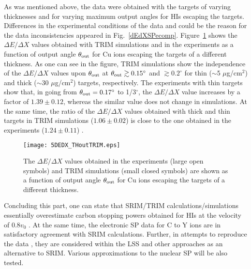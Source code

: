 \documentclass[aps,pra,twocolumn,amsmath,amssymb,floatfix]{revtex4-2}
\begin{document}
As was mentioned above, the data \cite{Fastrup66,Hvelp68,Lennard86} were obtained with the targets of varying thicknesses and for varying maximum output angles for HIs escaping the targets. Differences in the experimental conditions of the data \cite{Fastrup66,Hvelp68} and \cite{Lennard86} could be the reason for the data  inconsistencies appeared in Fig.~\ref{dEdXSPecomp}. Figure~\ref{dEdXTHout} shows the $\Delta E/\Delta X$ values obtained with TRIM simulations and in the experiments \cite{Hvelp68,Lennard86} as a function of output angle $\theta_{\rm out}$ for Cu ions escaping the targets of a different thickness. As one can see in the figure, TRIM simulations show the independence of the $\Delta E/\Delta X$ values upon $\theta_{\rm out}$ at $\theta_{\rm out} \gtrsim 0.15^{\circ}$ and $\gtrsim 0.2^{\circ}$ for thin ($\sim$5 $\mu$g/cm$^{2}$) and thick ($\sim$30 $\mu$g/cm$^{2}$) targets, respectively. The experiments with thin targets show that, in going from $\theta_{\rm out} = 0.17^{\circ}$ to 1/3$^{\circ}$, the $\Delta E/\Delta X$ value increases by a factor of $1.39\pm0.12$, whereas the similar value does not change in simulations. At the same time, the ratio of the $\Delta E/\Delta X$ values obtained with thick and thin targets in TRIM simulations ($1.06\pm0.02$) is close to the one obtained in the experiments ($1.24\pm0.11$) \cite{Lennard86}.

\begin{figure}[!h]  %
\begin{center}
\texttt{[image: 5DEDX\_THoutTRIM.eps]}
\vspace*{-10.5mm}
\caption{\label{dEdXTHout}The $\Delta E/\Delta X$ values obtained in the experiments \cite{Hvelp68,Lennard86} (large open symbols) and TRIM simulations (small closed symbols) are shown as a function of output angle $\theta_{\rm out}$ for Cu ions escaping the targets of a different thickness.}
\end{center}
\end{figure}

Concluding this part, one can state that SRIM/TRIM calculations/simulations essentially overestimate carbon stopping powers obtained for HIs at the velocity of $0.8 v_{0}$ \cite{Lennard86}. At the same time, the electronic SP data for C to Y ions \cite{Fastrup66,Hvelp68} are in satisfactory agreement with SRIM calculations. Further, in attempts to reproduce the data \cite{Fastrup66,Hvelp68,Lennard86}, they are considered within the LSS \cite{LSS63} and other approaches as an alternative to SRIM. Various approximations to the nuclear SP will be also tested.
\end{document}
